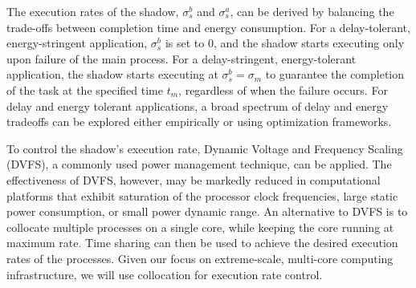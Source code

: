 The execution rates of the shadow, $\sigma_s^b$ and $\sigma_s^a$, can be derived by balancing the trade-offs between completion time and energy consumption.
For a delay-tolerant, energy-stringent application, $\sigma_s^b$ is set to 0, and the shadow starts executing only upon failure of the main process. %
For a delay-stringent, energy-tolerant application, the shadow starts executing at $\sigma_s^b=\sigma_m$ to guarantee the completion of the task at the specified time $t_m$, regardless of when the failure occurs. 
For delay and energy tolerant applications, a broad spectrum of delay and energy tradeoffs can be explored either empirically or using optimization frameworks.






To control the shadow's execution rate, Dynamic Voltage and Frequency Scaling (DVFS), a commonly used power management technique, can be applied. 
The effectiveness of DVFS, however, may be markedly reduced in computational platforms that exhibit saturation of the processor clock frequencies, large static power consumption, or small power dynamic range. An alternative to DVFS is to collocate multiple processes on a single core, while keeping the core running at maximum rate. Time sharing can then be used to achieve the desired execution rates of the processes. Given our focus on extreme-scale, multi-core computing infrastructure, we will use collocation for execution rate control.  

